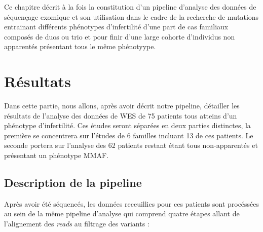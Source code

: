 \documentclass[12pt,twoside]{reedthesis}
\theoremstyle{definition}
\theoremstyle{definition}
\theoremstyle{remark}
\begin{document}
  Ce chapitre décrit à la fois la constitution d'un pipeline d'analyse des
  données de séquençage exomique et son utilisation dans le cadre de la
  recherche de mutations entrainant différents phénotypes d'infertilité
  d'une part de cas familiaux composés de duos ou trio et pour finir d'une
  large cohorte d'individus non apparentés présentant tous le même
  phénotyype.
  
  \newpage
  
  \section{Résultats}\label{resultats}
  
  Dans cette partie, nous allons, après avoir décrit notre pipeline,
  détailler les résultats de l'analyse des données de WES de 75 patients
  tous atteins d'un phénotype d'infertilité. Ces études seront séparées en
  deux parties distinctes, la première se concentrera sur l'études de 6
  familles incluant 13 de ces patients. Le seconde portera sur l'analyse
  des 62 patients restant étant tous non-apparentés et présentant un
  phénotype MMAF.
  
  \subsection{Description de la
  pipeline}\label{description-de-la-pipeline}
  
  Après avoir été séquencés, les données receuillies pour ces patients
  sont procéssées au sein de la même pipeline d'analyse qui comprend
  quatre étapes allant de l'alignement des \emph{reads} au filtrage des
  variants :
  
\end{document}
